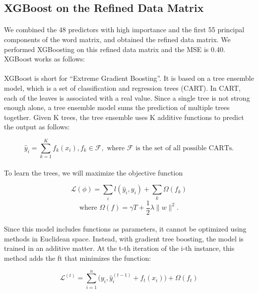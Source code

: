\documentclass[paper=a4, fontsize=11pt]{scrartcl} %
\numberwithin{equation}{section} %
\numberwithin{figure}{section} %
\numberwithin{table}{section} %
\begin{document}
{\subsection{XGBoost on the Refined Data Matrix}
\paragraph{}
We combined the 48 predictors with high importance and the first 55 principal components of the word matrix, and obtained the refined data matrix. We performed XGBoosting on this refined data matrix and the MSE is 0.40. XGBoost works as follows:

\paragraph{}
XGBoost is short for “Extreme Gradient Boosting”. It is based on a tree ensemble model, which is a set of classification and regression trees (CART). In CART, each of the leaves is associated with a real value. Since a single tree is not strong enough alone, a tree ensemble model sums the prediction of multiple trees together. Given K trees, the tree ensemble uses K additive functions to predict the output as follows:


$$\hat{y}_i = \sum_{k=1}^K f_k (x_i), f_k \in \mathcal{F}, \text{ where } \mathcal{F} \text{ is the set of all possible CARTs}.$$
\paragraph{}
To learn the trees, we will maximize the objective function

$$\mathcal{L}(\phi) = \sum_i l(\hat{y}_i, y_i) + \sum_k \Omega( f_k )$$
$$\text{where } \Omega( f ) = \gamma T + \frac{1}{2} \lambda \| w \|^2.$$

\paragraph{}
Since this model includes functions as parameters, it cannot be optimized using methods in Euclidean space. Instead, with gradient tree boosting, the model is trained in an additive matter. At the t-th iteration of the i-th instance, this method adds the ft that minimizes the function:

$$\mathcal{L}^{(t)} = \sum_{i=1}^n \big(y_i, \hat{y}_i ^{(t-1)} + f_t (x_i)\big) + \Omega(f_t) $$






}
\end{document}
